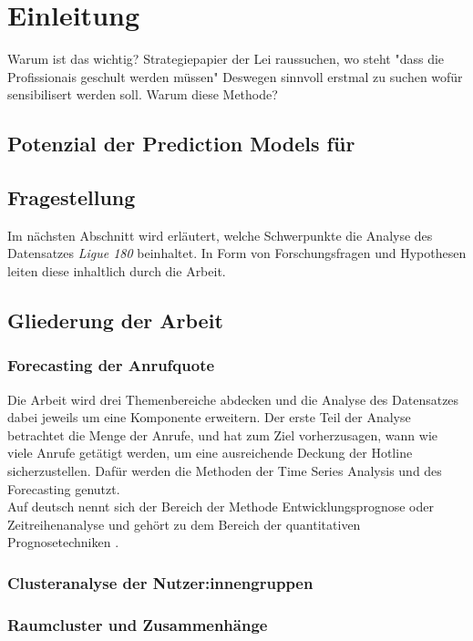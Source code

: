 \documentclass[12pt]{report}
\begin{document}
	\renewcommand{\headrulewidth}{0.1 pt}
	\renewcommand{\footrulewidth}{0 pt}
	
	\chapter{Einleitung}
	
	Warum ist das wichtig?
	Strategiepapier der Lei raussuchen, wo steht "dass die Profissionais geschult werden müssen"
	Deswegen sinnvoll erstmal zu suchen wofür sensibilisert werden soll. 
	Warum diese Methode?
	
	
	\section{Potenzial der Prediction Models für} %
	\section{Fragestellung}
	Im nächsten Abschnitt wird erläutert, welche Schwerpunkte die Analyse des Datensatzes \textit{Ligue 180} beinhaltet. In Form von Forschungsfragen und Hypothesen leiten diese inhaltlich durch die Arbeit. 
	\section{Gliederung der Arbeit}
	\subsection{Forecasting der Anrufquote}
	Die Arbeit wird drei Themenbereiche abdecken und die Analyse des Datensatzes dabei jeweils um eine Komponente erweitern. Der erste Teil der Analyse betrachtet die Menge der Anrufe, und hat zum Ziel vorherzusagen, wann wie viele Anrufe getätigt werden, um eine ausreichende Deckung der Hotline sicherzustellen. Dafür werden die Methoden der Time Series Analysis und des Forecasting genutzt. \\
	Auf deutsch nennt sich der Bereich der Methode Entwicklungsprognose oder Zeitreihenanalyse und gehört zu dem Bereich der quantitativen Prognosetechniken \cite[S. 11]{Vogel.2015}.
	\subsection{Clusteranalyse der Nutzer:innengruppen}
	\subsection{Raumcluster und Zusammenhänge}
\end{document}
